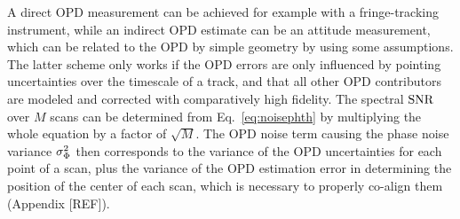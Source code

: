 A direct OPD measurement can be achieved for example with a fringe-tracking instrument, while an indirect OPD estimate can be an attitude measurement, which can be related to the OPD by simple geometry by using some assumptions. The latter scheme only works if the OPD errors are only influenced by pointing uncertainties over the timescale of a track, and that all other OPD contributors are modeled and corrected with comparatively high fidelity. The spectral $\textrm{SNR}$ over $M$ scans can be determined from Eq.~\ref{eq:noisephth} by multiplying the whole equation by a factor of $\sqrt{M}$. The OPD noise term causing the phase noise variance $\sigma^2_\Phi$ then corresponds to the variance of the OPD uncertainties for each point of a scan, plus the variance of the OPD estimation error in determining the position of the center of each scan, which is necessary to properly co-align them (Appendix [REF]).









